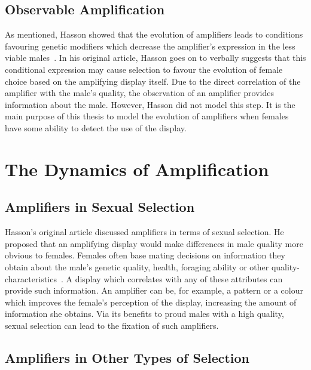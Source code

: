 \documentclass[a4paper,12pt]{article}
\numberwithin{equation}{section}
\begin{document}
\subsection{Observable Amplification}
\label{sec:Observable Amplification}

As mentioned, Hasson showed that the evolution of amplifiers leads to conditions favouring genetic modifiers which decrease the amplifier's expression in the less viable males~\cite{Hasson1989}. In his original article, Hasson goes on to verbally suggests that this conditional expression may cause selection to favour the evolution of female choice based on the amplifying display itself. Due to the direct correlation of the amplifier with the male's quality, the observation of an amplifier provides information about the male. However, Hasson did not model this step. It is the main purpose of this thesis to model the evolution of amplifiers when females have some ability to detect the use of the display.

\newpage


\section{The Dynamics of Amplification}
\label{sec:Introduction/The Dynamics of Amplification}
\subsection{Amplifiers in Sexual Selection}
\label{sec:Amplifiers in Sexual Selection}

Hasson's original article discussed amplifiers in terms of sexual selection. He proposed that an amplifying display would make differences in male quality more obvious to females. Females often base mating decisions on information they obtain about the male's genetic quality, health, foraging ability or other quality-characteristics~\cite{Jennions1997}. A display which correlates with any of these attributes can provide such information. An amplifier can be, for example, a pattern or a colour which improves the female's perception of the display, increasing the amount of information she obtains. Via its benefits to proud males with a high quality, sexual selection can lead to the fixation of such amplifiers.


\subsection{Amplifiers in Other Types of Selection}
\label{sec:Amplifiers in Other Types of Selection}
\end{document}
